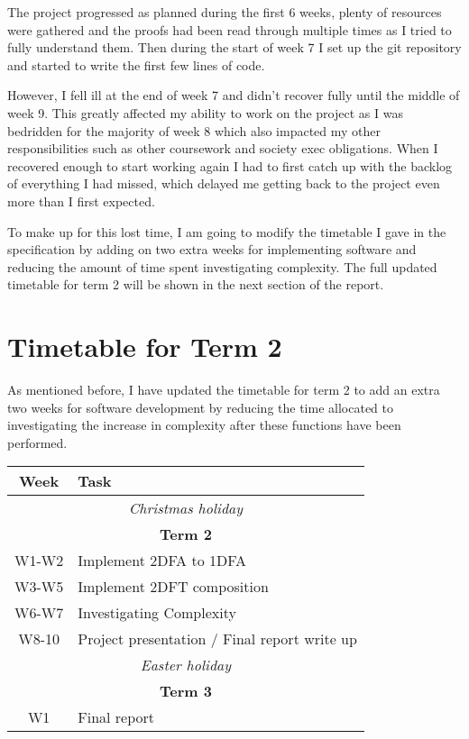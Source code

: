 \documentclass[12pt, a4paper]{article}
\begin{document}
The project progressed as planned during the first 6 weeks, plenty of resources were gathered and the proofs had been read through multiple times as I tried to fully understand them. Then during the start of week 7 I set up the git repository and started to write the first few lines of code.

However, I fell ill at the end of week 7 and didn't recover fully until the middle of week 9. This greatly affected my ability to work on the project as I was bedridden for the majority of week 8 which also impacted my other responsibilities such as other coursework and society exec obligations. When I recovered enough to start working again I had to first catch up with the backlog of everything I had missed, which delayed me getting back to the project even more than I first expected.

To make up for this lost time, I am going to modify the timetable I gave in the specification by adding on two extra weeks for implementing software and reducing the amount of time spent investigating complexity. The full updated timetable for term 2 will be shown in the next section of the report.

\section{Timetable for Term 2}

As mentioned before, I have updated the timetable for term 2 to add an extra two weeks for software development by reducing the time allocated to investigating the increase in complexity after these functions have been performed.

\begin{center}
    \begin{tabular}{| c | p{8cm} |}
        \hline
        \textbf{Week} & \textbf{Task} \\
        \hline
        \multicolumn{2}{|c|}{\textit{Christmas holiday}}\\
        \hline
        \multicolumn{2}{|c|}{\textbf{Term 2}} \\
        \hline
        W1-W2 & Implement 2DFA to 1DFA \\
        W3-W5 & Implement 2DFT composition \\
        W6-W7 & Investigating Complexity \\
        W8-10 & Project presentation / Final report write up \\
        \hline
        \multicolumn{2}{|c|}{\textit{Easter holiday}}\\
        \hline
        \multicolumn{2}{|c|}{\textbf{Term 3}}\\
        \hline
        W1 & Final report\\
        \hline
    \end{tabular}
\end{center}
\end{document}
